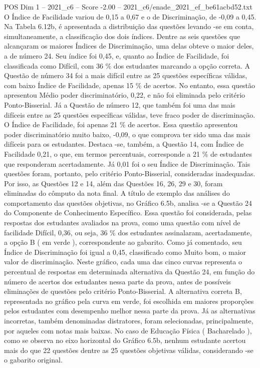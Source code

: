 \begin{textsample}{POS Dim 1 – 2021\_c6 – Score -2.00 – 2021\_c6/enade\_2021\_ef\_be61acbd52.txt}
O Índice de Facilidade variou de 0,15 a 0,67 e o de Discriminação, de -0,09 a 0,45.
Na Tabela 6.12b, é apresentada a distribuição das questões levando -se em conta, simultaneamente, a classificação dos dois índices.
Dentre as seis questões que alcançaram os maiores Índices de Discriminação, uma delas obteve o maior deles, a de número 24.
Seu índice foi 0,45, e, quanto ao Índice de Facilidade, foi classificada como Difícil, com 36 \% dos estudantes marcando a opção correta.
A Questão de número 34 foi a mais difícil entre as 25 questões específicas válidas, com baixo Índice de Facilidade, apenas 15 \% de acertos.
No entanto, essa questão apresentou Médio poder discriminatório, 0,22, e não foi eliminada pelo critério Ponto-Bisserial.
Já a Questão de número 12, que também foi uma das mais difíceis entre as 25 questões específicas válidas, teve fraco poder de discriminação.
O Índice de Facilidade, foi apenas 21 \% de acertos.
Essa questão apresentou poder discriminatório muito baixo, -0,09, o que comprova ter sido uma das mais difíceis para os estudantes.
Destaca -se, também, a Questão 14, com Índice de Facilidade 0,21, o que, em termos percentuais, corresponde a 21 \% de estudantes que responderam acertadamente.
Já 0,01 foi o seu Índice de Discriminação.
Tais questões foram, portanto, pelo critério Ponto-Bisserial, consideradas inadequadas.
Por isso, as Questões 12 e 14, além das Questões 16, 26, 29 e 30, foram eliminadas do cômputo da nota final.
A título de exemplo das análises do comportamento das questões objetivas, no Gráfico 6.5b, analisa -se a Questão 24 do Componente de Conhecimento Específico.
Essa questão foi considerada, pelas respostas dos estudantes avaliados na prova, como uma questão com nível de facilidade Difícil, 0,36, ou seja, 36 \% dos estudantes assinalaram, acertadamente, a opção B ( em verde ), correspondente ao gabarito.
Como já comentado, seu Índice de Discriminação foi igual a 0,45, classificado como Muito bom, o maior valor de discriminação.
Neste gráfico, cada uma das cinco curvas representa o percentual de respostas em determinada alternativa da Questão 24, em função do número de acertos dos estudantes nessa parte da prova, antes de possíveis eliminações de questões pelo critério Ponto-Bisserial.
A alternativa correta B, representada no gráfico pela curva em verde, foi escolhida em maiores proporções pelos estudantes com desempenho melhor nessa parte da prova.
Já as alternativas incorretas, também denominadas distratores, foram selecionadas, principalmente, por aqueles com notas mais baixas.
No caso de Educação Física ( Bacharelado ), como se observa no eixo horizontal do Gráfico 6.5b, nenhum estudante acertou mais do que 22 questões dentre as 25 questões objetivas válidas, considerando -se o gabarito original.

\end{textsample}

